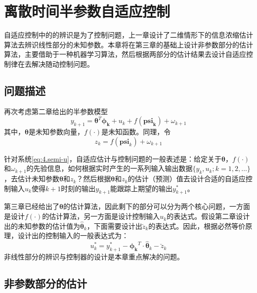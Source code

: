 \chapter{离散时间半参数自适应控制}\label{chap:4}
自适应控制中的的辨识是为了控制问题，上一章设计了二维情形下的信息浓缩估计算法去辨识线性部分的未知参数。本章将在第三章的基础上设计非参数部分的估计算法，主要借助于一种机器学习算法，然后根据两部分的估计结果去设计自适应控制律在去解决随动控制问题。
\section{问题描述}\label{sect:4.1}
再次考虑第二章给出的半参数模型
\begin{equation}%
\label{eq:4.semi-u}
y_{k+1} = \bm{\theta}^{T}\bm{\phi_{k}}+u_{k}+f(\bm{\bm{psi}_{k}})+\omega_{k+1}
\end{equation}
其中，$\bm{\theta}$是未知参数向量，$f(\cdot)$是未知函数。同理，令
\begin{equation}
z_{k} = f(\bm{psi}_{k}) + \omega_{k+1}
\end{equation}

针对系统\eqref{eq:4.semi-u}，自适应估计与控制问题的一般表述是：给定关于$\bm{\theta}$，$f(\cdot)$和$\omega_{k+1}$的先验信息，如何根据实时产生的一系列输入输出数据$\{y_{k},u_{k};k=1,2,\ldots\}$，去估计未知参数$\bm{\theta}$和$z_{k}$？然后根据$\bm{\theta}$和$z_{k}$的估计（预测）值去设计合适的自适应控制输入$u_{k}$使得$k+1$时刻的输出$y_{k+1}$能跟踪上期望的输出$y_{k+1}^{*}$。

第三章已经给出了$\bm{\theta}$的估计算法，因此剩下的部分可以分为两个核心问题，一方面是设计$f(\cdot)$的估计算法，另一方面是设计控制输入$u_{k}$的表达式。假设第二章设计出的未知参数的估计值为$\hat{\bm{\theta}}_{k}$，下面需要设计出$\breve{z}_{k}$的表达式。因此，根据必然等价原理，设计出的控制输入的一般表达式为：
\begin{equation}\label{eq:4.uk}
u_{k}^{*}=y_{k+1}^{*}-\bm{\phi_{k}}^{T}\cdot\hat{\bm{\theta}}_{k}-\breve{z}_{k}
\end{equation}
非线性部分的辨识与控制器的设计是本章重点解决的问题。

\section{非参数部分的估计}\label{sect:4.2}

